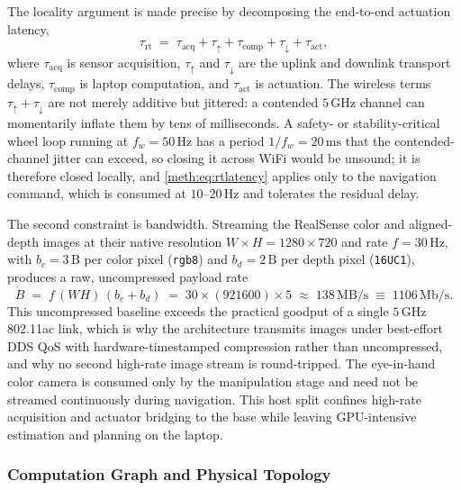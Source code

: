 The locality argument is made precise by decomposing the end-to-end actuation latency,
\begin{equation}\label{meth:eq:rtlatency}
\tau_{\mathrm{rt}} \;=\; \tau_{\mathrm{acq}} + \tau_{\uparrow} + \tau_{\mathrm{comp}} + \tau_{\downarrow} + \tau_{\mathrm{act}},
\end{equation}
where $\tau_{\mathrm{acq}}$ is sensor acquisition, $\tau_{\uparrow}$ and $\tau_{\downarrow}$ are the uplink and downlink transport delays, $\tau_{\mathrm{comp}}$ is laptop computation, and $\tau_{\mathrm{act}}$ is actuation. The wireless terms $\tau_{\uparrow}+\tau_{\downarrow}$ are not merely additive but jittered: a contended \ensuremath{5\,\mathrm{GHz}} channel can momentarily inflate them by tens of milliseconds. A safety- or stability-critical wheel loop running at $f_w=\ensuremath{50\,\mathrm{Hz}}$ has a period $1/f_w=\ensuremath{20\,\mathrm{ms}}$ that the contended-channel jitter can exceed, so closing it across WiFi would be unsound; it is therefore closed locally, and \eqref{meth:eq:rtlatency} applies only to the navigation command, which is consumed at \ensuremath{10\text{--}20\,\mathrm{Hz}} and tolerates the residual delay.

The second constraint is bandwidth. Streaming the RealSense color and aligned-depth images at their native resolution $W\!\times\!H=1280\!\times\!720$ and rate $f=\ensuremath{30\,\mathrm{Hz}}$, with $b_c=\ensuremath{3\,\mathrm{B}}$ per color pixel (\texttt{rgb8}) and $b_d=\ensuremath{2\,\mathrm{B}}$ per depth pixel (\texttt{16UC1}), produces a raw, uncompressed payload rate
\begin{equation}\label{meth:eq:bandwidth}
\dot{B} \;=\; f\,(W H)\,(b_c+b_d) \;=\; 30\times(921600)\times 5 \;\approx\; \ensuremath{138\,\mathrm{MB/s}} \;\equiv\; \ensuremath{1106\,\mathrm{Mb/s}}.
\end{equation}
This uncompressed baseline exceeds the practical goodput of a single \ensuremath{5\,\mathrm{GHz}} \mbox{802.11ac} link, which is why the architecture transmits images under best-effort DDS QoS with hardware-timestamped compression rather than uncompressed, and why no second high-rate image stream is round-tripped. The eye-in-hand color camera is consumed only by the manipulation stage and need not be streamed continuously during navigation. This host split confines high-rate acquisition and actuator bridging to the base while leaving GPU-intensive estimation and planning on the laptop.

\subsubsection{Computation Graph and Physical Topology}

